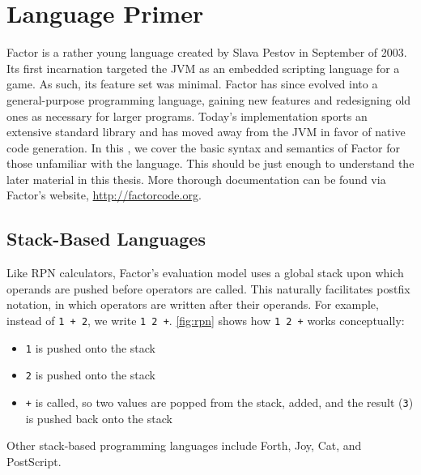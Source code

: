 \section{Language Primer}\label{sec:primer}


Factor is a rather young language created by Slava Pestov in September of 2003.
Its first incarnation targeted the \gls{JVM} as an embedded scripting language
for a game.  As such, its feature set was minimal.  Factor has since evolved
into a general-purpose programming language, gaining new features and
redesigning old ones as necessary for larger programs.  Today's implementation
sports an extensive standard library and has moved away from the \gls{JVM} in
favor of native code generation.  In this , we cover the
basic syntax and semantics of Factor for those unfamiliar with the language.
This should be just enough to understand the later material in this thesis.
More thorough documentation can be found via Factor's website,
\url{http://factorcode.org}.

\subsection{Stack-Based Languages}\label{sec:primer:stack-based}


Like \gls{RPN} calculators, Factor's evaluation model uses a global stack upon
which operands are pushed before operators are called.  This naturally
facilitates postfix notation, in which operators are written after their
operands.  For example, instead of \texttt{1~+~2}, we write \texttt{1~2~+}.
\cref{fig:rpn} shows how \texttt{1~2~+} works conceptually:
\begin{itemize}
  \item \texttt{1} is pushed onto the stack
  \item \texttt{2} is pushed onto the stack
  \item \texttt{+} is called, so two values are popped from the stack, added,
        and the result (\texttt{3}) is pushed back onto the stack
\end{itemize}
Other stack-based programming languages include Forth,
Joy, Cat, and PostScript.

